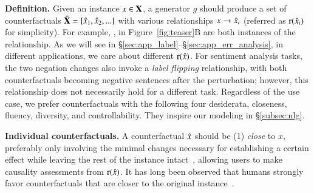 \textbf{Definition.}
Given an instance $x \in \mathbf{X}$, a generator $g$ should produce a set of counterfactuals $\hat{\mathbf{X}} = \{\hat{x}_1, \hat{x}_2, ...\}$ with various relationships $x \rightarrow \hat{x}_i$ (referred as $\operatorname*{r}(\hat{x}_i)$ for simplicity).
For example, ,  in Figure~\ref{fig:teaser}B are both instances of the  relationship.
As we will see in \S\ref{sec:app_label}--\S\ref{sec:app_err_analysis}, in different applications, we care about different $\operatorname*{r}(\hat{x})$.
For sentiment analysis tasks, the two negation changes also invoke a \emph{label flipping} relationship, with both counterfactuals becoming negative sentences after the perturbation; however, this relationship does not necessarily hold for a different task.
Regardless of the use case, we prefer counterfactuals with the following four desiderata, \ie closeness, fluency, diversity, and controllability.
They inspire our modeling in \S\ref{subsec:nlg}.


\textbf{Individual counterfactuals.} 
A counterfactual $\hat{x}$ should be (1) \emph{close} to $x$, preferably only involving the minimal changes necessary for establishing a certain effect while leaving the rest of the instance intact~\cite{pearl2018causal}, allowing users to make causality assessments from $\operatorname*{r}(\hat{x})$. 
It has long been observed that humans strongly favor counterfactuals that are closer to the original instance~\cite{kahneman}.

